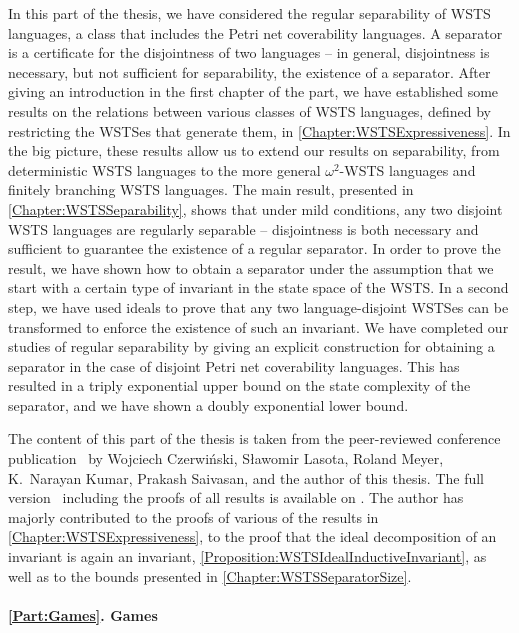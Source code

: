 \documentclass[../../diss.tex]{subfiles}
\begin{document}
In this part of the thesis, we have considered the regular separability of WSTS languages, a class that includes the Petri net coverability languages.
A separator is a certificate for the disjointness of two languages -- in general, disjointness is necessary, but not sufficient for separability, \ie the existence of a separator.
After giving an introduction in the first chapter of the part, we have established some results on the relations between various classes of WSTS languages, defined by restricting the WSTSes that generate them, in \cref{Chapter:WSTSExpressiveness}.
In the big picture, these results allow us to extend our results on separability, \eg from deterministic WSTS languages to the more general $\omega^2$-WSTS languages and finitely branching WSTS languages.
The main result, presented in \cref{Chapter:WSTSSeparability}, shows that under mild conditions, any two disjoint WSTS languages are regularly separable -- disjointness is both necessary and sufficient to guarantee the existence of a regular separator.
In order to prove the result, we have shown how to obtain a separator under the assumption that we start with a certain type of invariant in the state space of the WSTS.\@
In a second step, we have used ideals to prove that any two language-disjoint WSTSes can be transformed to enforce the existence of such an invariant.
We have completed our studies of regular separability by giving an explicit construction for obtaining a separator in the case of disjoint Petri net coverability languages.
This has resulted in a triply exponential upper bound on the state complexity of the separator, and we have shown a doubly exponential lower bound.

The content of this part of the thesis is taken from the peer-reviewed conference publication~\cite{CzerwinskiLMMKS18} by Wojciech Czerwiński, Sławomir Lasota, Roland Meyer, K.~Narayan Kumar, Prakash Saivasan, and the author of this thesis.
The full version~\cite{CzerwinskiLMMKS18a} including the proofs of all results is available on \arXiv.
The author has majorly contributed to the proofs of various of the results in \cref{Chapter:WSTSExpressiveness}, to the proof that the ideal decomposition of an invariant is again an invariant, \cref{Proposition:WSTSIdealInductiveInvariant}, as well as to the bounds presented in \cref{Chapter:WSTSSeparatorSize}.

\paragraph{\cref{Part:Games}. Games}
\end{document}
